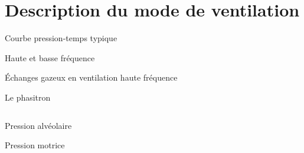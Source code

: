 \section{Description du mode de ventilation}

\begin{frame}{Courbe pression-temps typique}
	\centering
	
\end{frame}

\begin{frame}{Haute et basse fréquence}
	
\end{frame}

\begin{frame}{Échanges gazeux en ventilation haute fréquence}
	
\end{frame}

\begin{frame}{Le phasitron}
	\begin{columns}
		

		
	\end{columns}
\end{frame}

\begin{frame}{Pression alvéolaire}
	\centering
	
\end{frame}

\begin{frame}{Pression motrice}
	\centering
	
\end{frame}

